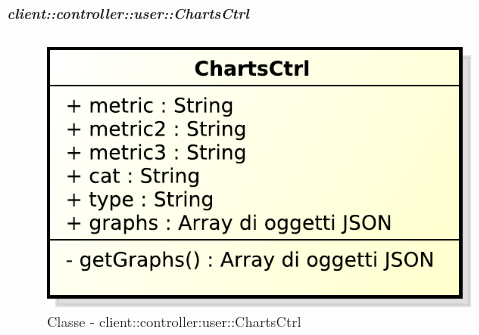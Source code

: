 		\subparagraph{client::controller::user::ChartsCtrl} %
		\label{subp:client_controller_user_chartsctrl}
			\begin{figure}[htbp]
				\centering
				\centerline{\includegraphics[scale=0.6]{./images/client/classes/controller/charts_ctrl.pdf}}
				\caption{Classe - client::controller:user::ChartsCtrl}
			\end{figure}
